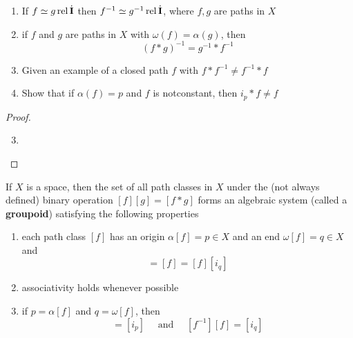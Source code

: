 \documentclass[11pt]{article}
\DeclareMathOperator{\rel}{\text{rel}}
\begin{document}
\begin{exercise}
\label{ex3.6}
\begin{enumerate}
\item If \(f\simeq g\rel\dbI\) then \(f^{-1}\simeq g^{-1}\rel\dbI\), where \(f,g\) are paths in \(X\)
\item if \(f\) and \(g\) are paths in \(X\) with \(\omega(f)=\alpha(g)\), then
\begin{equation*}
(f*g)^{-1}=g^{-1}*f^{-1}
\end{equation*}
\item Given an example of a closed path \(f\) with \(f*f^{-1}\neq f^{-1}*f\)
\item Show that if \(\alpha(f)=p\) and \(f\) is notconstant, then \(i_p*f\neq f\)
\end{enumerate}
\end{exercise}

\begin{proof}
\begin{enumerate}
\setcounter{enumi}{2}
\item \label{Problem3}
\end{enumerate}
\end{proof}

\begin{theorem}[]
If \(X\) is a space, then the set of all path classes in \(X\) under the (not always defined)
binary operation \([f][g]=[f*g]\) forms an algebraic system (called a \textbf{groupoid}) satisfying the
following properties
\begin{enumerate}
\item each path class \([f]\) has an origin \(\alpha[f]=p\in X\) and an end \(\omega[f]=q\in X\) and
\begin{equation*}
[i_p][f]=[f]=[f][i_q]
\end{equation*}
\item associativity holds whenever possible
\item if \(p=\alpha[f]\) and \(q=\omega[f]\), then
\begin{equation*}
[f][f^{-1}]=[i_p] \quad\text{ and }\quad [f^{-1}][f]=[i_q]
\end{equation*}
\end{enumerate}
\end{theorem}
\end{document}
